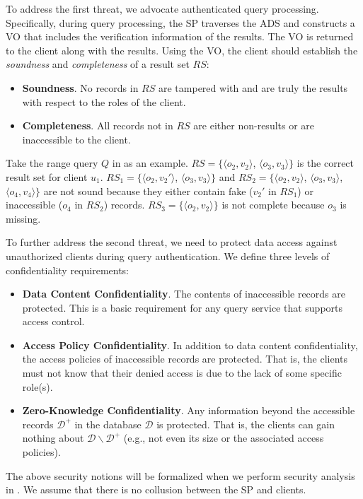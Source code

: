 To address the first threat, we advocate authenticated query processing. Specifically, during query processing, the SP traverses the ADS and constructs a VO that includes the verification information of the results. The VO is returned to the client along with the results. Using the VO, the client should establish the \emph{soundness} and \emph{completeness} of a result set $RS$:
\begin{itemize}
  \item \textbf{Soundness}. No records in $RS$ are tampered with and are truly the results with respect to the roles of the client.
  \item \textbf{Completeness}. All records not in $RS$ are either non-results or are inaccessible to the client.
\end{itemize}
Take the range query $Q$ in  as an example. $RS=\{\langle o_2, v_2\rangle$, $\langle o_3, v_3\rangle\}$ is the correct result set for client $u_1$. $RS_1 = \{\langle o_2, v_2'\rangle$, $\langle o_3, v_3\rangle\}$ and $RS_2 = \{\langle o_2, v_2\rangle$, $\langle o_3, v_3\rangle$, $\langle o_4, v_4\rangle\}$ are not sound because they either contain fake ($v_2'$ in $RS_1$) or inaccessible ($o_4$ in $RS_2$) records. $RS_3 = \{\langle o_2, v_2\rangle\}$ is not complete because $o_3$ is missing.

To further address the second threat, we need to protect data access against unauthorized clients during query authentication. We define three levels of confidentiality requirements:
\begin{itemize}
  \item \textbf{Data Content Confidentiality}. The contents of inaccessible records are protected. This is a basic requirement for any query service that supports access control.
  \item \textbf{Access Policy Confidentiality}. In addition to data content confidentiality, the access policies of inaccessible records are protected. That is, the clients must not know that their denied access is due to the lack of some specific role(s). %
  \item \textbf{Zero-Knowledge Confidentiality}.
    Any information beyond the accessible records $\mathcal{D}^+$ in the database $\mathcal{D}$ is protected. That is, the clients can gain nothing about $\mathcal{D}\backslash\mathcal{D}^+$ (e.g., not even its size or the associated access policies).
\end{itemize}
The above security notions will be formalized when we perform security analysis in . We assume that there is no collusion between the SP and clients.


